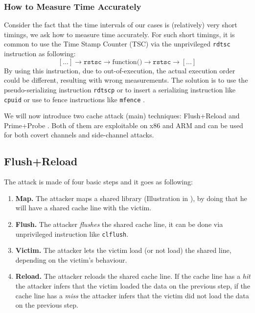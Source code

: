 \subsubsection{How to Measure Time Accurately}
\label{subsubsec:howtomeasuretimeaccuractely}
Consider the fact that the time intervals of our cases is (relatively) very short timings, we ask how to measure time accurately. For such short timings, it is common to use the Time Stamp Counter (TSC) via the unprivileged \texttt{rdtsc} instruction as following:
$$[...] \rightarrow \texttt{rstsc} \rightarrow \mbox{function()} \rightarrow \texttt{rstsc} \rightarrow [...]$$
\noindent By using this instruction, due to out-of-execution, the actual execution order could be different, resulting with wrong measurements. The solution is to use the pseudo-serializing instruction \texttt{rdtscp} or to insert a serializing instruction like \texttt{cpuid} or use to fence instructions like \texttt{mfence} \cite{benchmark2010}.

We will now introduce two cache attack (main) techniques: Flush+Reload \cite{Gullasch:2011:CGB:2006077.2006784, Osvik:2006:CAC:2117739.2117741, Yarom2014} and Prime+Probe \cite{Percival2009,Osvik:2006:CAC:2117739.2117741,Liu:2015:LCS:2867539.2867673}. Both of them are exploitable on x86 and ARM and can be used for both covert channels and side-channel attacks.
\subsection{Flush+Reload}
\label{subsec:flushreload}
The attack is made of four basic steps and it goes as following:
\begin{enumerate}
    \item \textbf{Map. } The attacker maps a shared library (Illustration in ), by doing that he will have a shared cache line with the victim.
    \item \textbf{Flush.} The attacker \textit{flushes} the shared cache line, it can be done via unprivileged instruction like \texttt{clflush}.
    \item \textbf{Victim.} The attacker lets the victim load (or not load) the shared line, depending on the victim's behaviour.
    \item \textbf{Reload.} The attacker reloads the shared cache line. If the cache line has a \textit{hit} the attacker infers that the victim loaded the data on the previous step, if the cache line has a \textit{miss} the attacker infers that the victim did not load the data on the previous step.
\end{enumerate}

